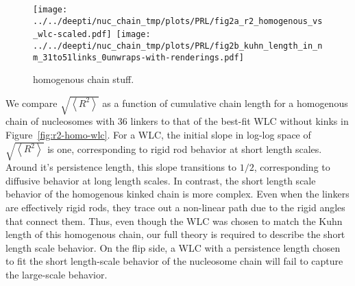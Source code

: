 \documentclass[%
 reprint,
superscriptaddress,
showpacs,preprintnumbers,
 amsmath,amssymb,
 aps,
 prl,
]{revtex4-1}
\newcommand{\RR}{\left\langle{}R^2\right\rangle{}}
\begin{document}
\begin{figure}
    \mbox{\texttt{[image: ../../deepti/nuc\_chain\_tmp/plots/PRL/fig2a\_r2\_homogenous\_vs\_wlc-scaled.pdf]}
    \texttt{[image: ../../deepti/nuc\_chain\_tmp/plots/PRL/fig2b\_kuhn\_length\_in\_nm\_31to51links\_0unwraps-with-renderings.pdf]}}
    \caption{homogenous chain stuff.}\label{fig:homo-chain}
\end{figure}

We compare $\sqrt{\RR}$ as a
function of cumulative chain length for a homogenous chain of
nucleosomes with \SI{36}{\basepair} linkers to that of the best-fit WLC without
kinks in Figure~\ref{fig:r2-homo-wlc}.
For a WLC, the initial slope in log-log space of $\sqrt{\RR}$ is one,
    corresponding to rigid rod behavior at short length scales.
Around it's persistence length, this slope transitions to $1/2$, corresponding
    to diffusive behavior at long length scales.
In contrast, the short length scale behavior of the homogenous kinked chain is more
    complex. Even when the linkers are effectively rigid rods, they trace
    out a non-linear path due to the rigid angles that connect them.
Thus, even though the WLC was chosen to match the Kuhn length of this
    homogenous chain, our full theory is required to describe the short length
    scale behavior. On the flip side, a WLC with a persistence length chosen to fit the short length-scale behavior of the nucleosome chain will fail to capture the large-scale behavior.
\end{document}
